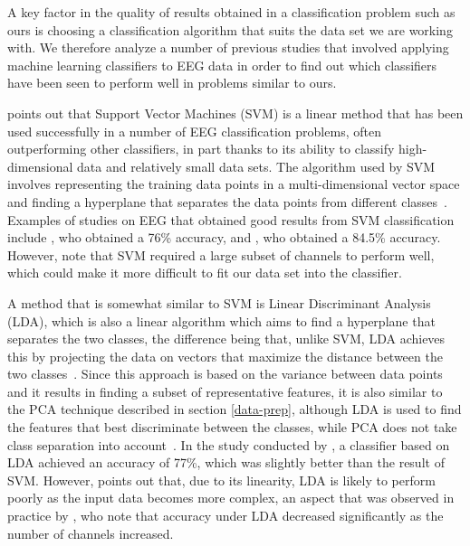 \documentclass{mprop}
\begin{document}
A key factor in the quality of results obtained in a classification problem such as ours is choosing a classification algorithm that suits the data set we are working with. We therefore analyze a number of previous studies that involved applying machine learning classifiers to EEG data in order to find out which classifiers have been seen to perform well in problems similar to ours.

\citet{lotte_review_2007} points out that Support Vector Machines (SVM) is a linear method that has been used successfully in a number of EEG classification problems, often outperforming other classifiers, in part thanks to its ability to classify high-dimensional data and relatively small data sets. The algorithm used by SVM involves representing the training data points in a multi-dimensional vector space and finding a hyperplane that separates the data points from different classes~\cite{gandhi_support_2018}. Examples of studies on EEG that obtained good results from SVM classification include \citet{vuckovic_prediction_2018}, who obtained a 76\% accuracy, and \citet{kaper_bci_2004}, who obtained a 84.5\% accuracy. However, \citet{gallardo_transferable_2017} note that SVM required a large subset of channels to perform well, which could make it more difficult to fit our data set into the classifier.

A method that is somewhat similar to SVM is Linear Discriminant Analysis (LDA), which is also a linear algorithm which aims to find a hyperplane that separates the two classes, the difference being that, unlike SVM, LDA achieves this by projecting the data on vectors that maximize the distance between the two classes~\cite{lotte_review_2007}. Since this approach is based on the variance between data points and it results in finding a subset of representative features, it is also similar to the PCA technique described in section \ref{data-prep}, although LDA is used to find the features that best discriminate between the classes, while PCA does not take class separation into account~\cite{martinez_pca_2001}. In the study conducted by \citet{vuckovic_prediction_2018}, a classifier based on LDA achieved an accuracy of 77\%, which was slightly better than the result of SVM. However, \citet{lotte_review_2007} points out that, due to its linearity, LDA is likely to perform poorly as the input data becomes more complex, an aspect that was observed in practice by \citet{gallardo_transferable_2017}, who note that accuracy under LDA decreased significantly as the number of channels increased.
\end{document}
